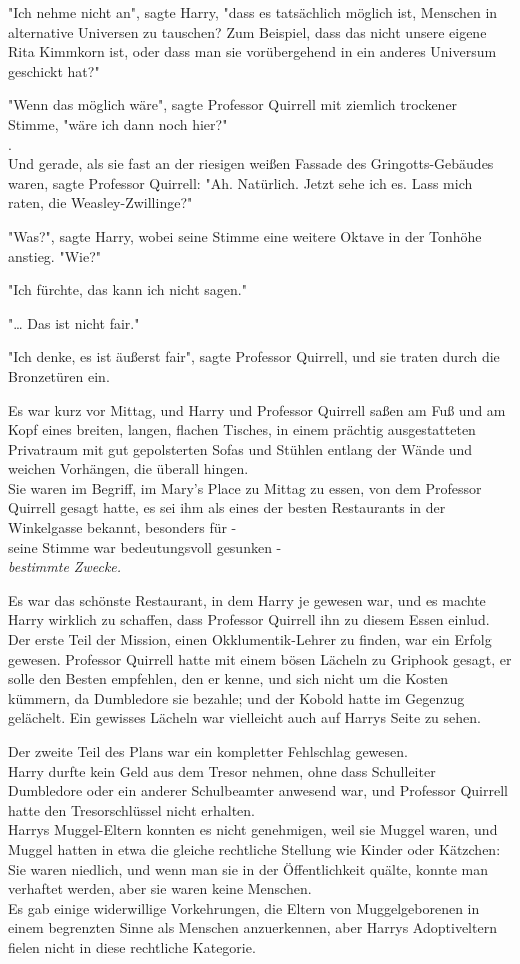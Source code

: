{"Ich nehme nicht an", sagte Harry, "dass es tatsächlich möglich ist, Menschen in alternative Universen zu tauschen? Zum Beispiel, dass das nicht unsere eigene Rita Kimmkorn ist, oder dass man sie vorübergehend in ein anderes Universum geschickt hat?"

"Wenn das möglich wäre", sagte Professor Quirrell mit ziemlich trockener Stimme, "wäre ich dann noch hier?"\\ .\\ Und gerade, als sie fast an der riesigen weißen Fassade des Gringotts-Gebäudes waren, sagte Professor Quirrell: "Ah. Natürlich. Jetzt sehe ich es. Lass mich raten, die Weasley-Zwillinge?"

"Was?", sagte Harry, wobei seine Stimme eine weitere Oktave in der Tonhöhe anstieg. "Wie?"

"Ich fürchte, das kann ich nicht sagen."

"… Das ist nicht fair."

"Ich denke, es ist äußerst fair", sagte Professor Quirrell, und sie traten durch die Bronzetüren ein.

Es war kurz vor Mittag, und Harry und Professor Quirrell saßen am Fuß und am Kopf eines breiten, langen, flachen Tisches, in einem prächtig ausgestatteten Privatraum mit gut gepolsterten Sofas und Stühlen entlang der Wände und weichen Vorhängen, die überall hingen.\\ Sie waren im Begriff, im Mary's Place zu Mittag zu essen, von dem Professor Quirrell gesagt hatte, es sei ihm als eines der besten Restaurants in der Winkelgasse bekannt, besonders für -\\ seine Stimme war bedeutungsvoll gesunken -\\ \emph{bestimmte Zwecke.}

Es war das schönste Restaurant, in dem Harry je gewesen war, und es machte Harry wirklich zu schaffen, dass Professor Quirrell ihn zu diesem Essen einlud.\\ Der erste Teil der Mission, einen Okklumentik-Lehrer zu finden, war ein Erfolg gewesen. Professor Quirrell hatte mit einem bösen Lächeln zu Griphook gesagt, er solle den Besten empfehlen, den er kenne, und sich nicht um die Kosten kümmern, da Dumbledore sie bezahle; und der Kobold hatte im Gegenzug gelächelt. Ein gewisses Lächeln war vielleicht auch auf Harrys Seite zu sehen.

Der zweite Teil des Plans war ein kompletter Fehlschlag gewesen.\\ Harry durfte kein Geld aus dem Tresor nehmen, ohne dass Schulleiter Dumbledore oder ein anderer Schulbeamter anwesend war, und Professor Quirrell hatte den Tresorschlüssel nicht erhalten.\\ Harrys Muggel-Eltern konnten es nicht genehmigen, weil sie Muggel waren, und Muggel hatten in etwa die gleiche rechtliche Stellung wie Kinder oder Kätzchen: Sie waren niedlich, und wenn man sie in der Öffentlichkeit quälte, konnte man verhaftet werden, aber sie waren keine Menschen.\\ Es gab einige widerwillige Vorkehrungen, die Eltern von Muggelgeborenen in einem begrenzten Sinne als Menschen anzuerkennen, aber Harrys Adoptiveltern fielen nicht in diese rechtliche Kategorie.

}
